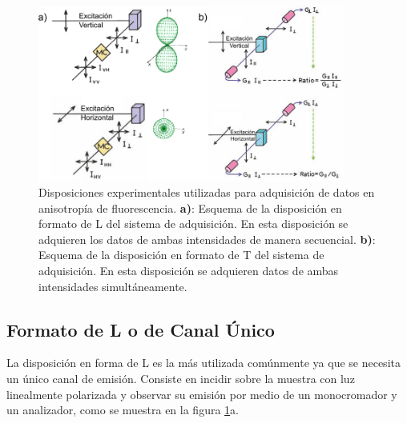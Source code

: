 \begin{figure}
    \centering
    \includegraphics[width=0.9\textwidth]{./img/Formats.png}
    \caption{Disposiciones experimentales utilizadas para adquisición de datos en anisotropía de fluorescencia\cite{Lakowicz2006}. \textbf{a)}: Esquema de la disposición en formato de L del sistema de adquisición. En esta disposición se adquieren los datos de ambas intensidades de manera secuencial. \textbf{b)}: Esquema de la disposición en formato de T del sistema de adquisición. En esta disposición se adquieren datos de ambas intensidades simultáneamente.}
    \label{fig:Formats}
\end{figure}

\subsection{Formato de L o de Canal Único}

La disposición en forma de L es la más utilizada comúnmente ya que se necesita un único canal de emisión. Consiste en incidir sobre la muestra con luz linealmente polarizada y observar su emisión por medio de un monocromador y un analizador, como se muestra en la figura \ref{fig:Formats}a.


